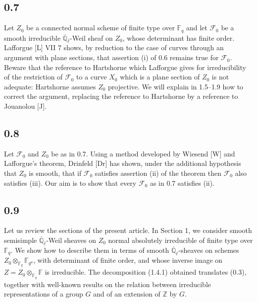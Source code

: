 \documentclass[10pt]{article}
\newcommand{\F}{\mathbb{F}}
\newcommand{\Z}{\mathbb{Z}}
\newcommand{\Ql}{\overline{\mathbb Q}_{\ell}}
\begin{document}
\subsection*{0.7}
Let $Z_0$ be a connected normal scheme of finite type over $\F_q$ and let $\mathcal F_0$ be a smooth irreducible $\Ql$-Weil sheaf on $Z_0$, whose determinant has finite order.
Lafforgue [L] VII 7 shows, by reduction to the case of curves through an argument with plane sections, that assertion (i) of 0.6 remains true for $\mathcal F_0$.
Beware that the reference to Hartshorne which Lafforgue gives for irreducibility of the restriction of $\mathcal F_0$ to a curve $X_0$ which is a plane section of $Z_0$ is not adequate: Hartshorne assumes $Z_0$ projective.
We will explain in 1.5--1.9 how to correct the argument, replacing the reference to Hartshorne by a reference to Jouanolou [J].

\subsection*{0.8}
Let $\mathcal F_0$ and $Z_0$ be as in 0.7.
Using a method developed by Wiesend [W] and Lafforgue's theorem, Drinfeld [Dr] has shown, under the additional hypothesis that $Z_0$ is smooth, that if $\mathcal F_0$ satisfies assertion (ii) of the theorem then $\mathcal F_0$ also satisfies (iii).
Our aim is to show that every $\mathcal F_0$ as in 0.7 satisfies (ii).

\subsection*{0.9}
Let us review the sections of the present article.
In Section 1, we consider smooth semisimple $\Ql$-Weil sheaves on $Z_0$ normal absolutely irreducible of finite type over $\F_q$.
We show how to describe them in terms of smooth $\Ql$-sheaves on schemes $Z_0\otimes_{\F_q}\F_{q^a}$, with determinant of finite order, and whose inverse image on $Z=Z_0\otimes_{\F_q}\F$ is irreducible.
The decomposition (1.4.1) obtained translates (0.3), together with well-known results on the relation between irreducible representations of a group $G$ and of an extension of $\Z$ by $G$.
\end{document}
